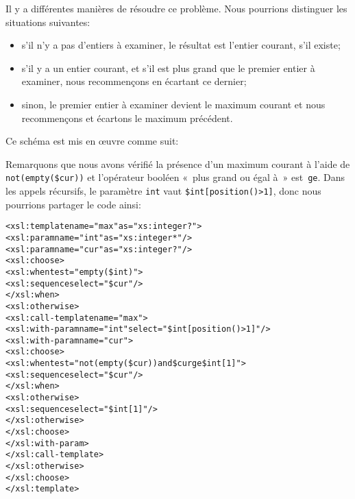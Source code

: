 Il y a différentes manières de résoudre ce problème. Nous pourrions
distinguer les situations suivantes:
\begin{itemize}

  \item s'il n'y a pas d'entiers à examiner, le résultat est l'entier
    courant, s'il existe;

  \item s'il y a un entier courant, et s'il est plus grand que le
    premier entier à examiner, nous recommençons en écartant ce
    dernier;

  \item sinon, le premier entier à examiner devient le maximum courant
    et nous recommençons et écartons le maximum précédent.

\end{itemize}
Ce schéma est mis en œuvre comme suit:
Remarquons que nous avons vérifié la présence d'un maximum courant à
l'aide de \texttt{not(empty(\$cur))} et l'opérateur booléen \XPath
«~plus grand ou égal à~» est~\texttt{ge}. Dans les appels récursifs, le
paramètre \texttt{int} vaut \texttt{\$int[position()>1]}, donc nous
pourrions partager le code ainsi:
\begin{alltt}
\small<xsl:template name="max" as="xs:integer?">
  <xsl:param name="int" as="xs:integer*"/>
  <xsl:param name="cur" as="xs:integer?"/>
  <xsl:choose>
    <xsl:when test="empty(\$int)">
      <xsl:sequence select="\$cur"/>
    </xsl:when>
    <xsl:otherwise>
      <xsl:call-template name="max">
        <xsl:with-param name="int" select="\$int[position()>1]"/>
        <xsl:with-param name="cur">
          <xsl:choose>
            <xsl:when test="not(empty(\$cur))\! and\! \$cur ge \$int[1]">
              <xsl:sequence select="\$cur"/>
            </xsl:when>
            <xsl:otherwise>
              <xsl:sequence select="\$int[1]"/>
            </xsl:otherwise>
          </xsl:choose>
        </xsl:with-param>
      </xsl:call-template>
    </xsl:otherwise>
  </xsl:choose>
</xsl:template>
\end{alltt}

